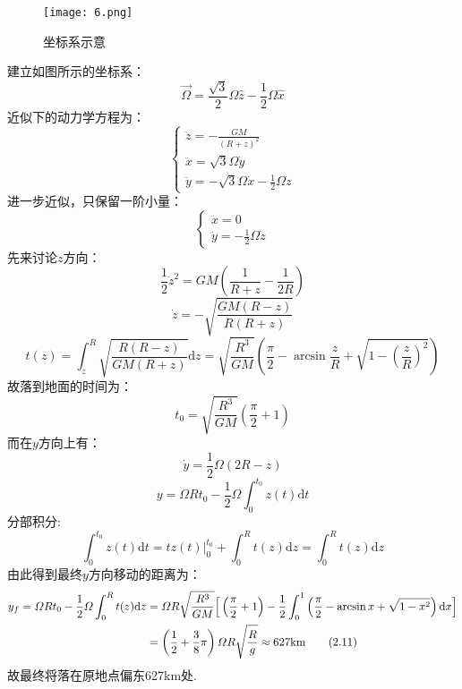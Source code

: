 \documentclass{ctexart}
\begin{document}
\begin{figure}[H]
  \centering
  \texttt{[image: 6.png]}
\caption*{坐标系示意}
\end{figure}
\noindent 建立如图所示的坐标系：
\begin{equation}
\vec{\varOmega}=\frac{\sqrt{3}}{2}\varOmega\hat{z}-\frac{1}{2}\varOmega\hat{x}\tag{2.1}
\end{equation}
近似下的动力学方程为：
	\begin{equation}
  \begin{cases}
		\displaystyle \ddot{z}=-\frac{GM}{(R+z)^2}\\
		\ddot{x}=\sqrt{3}\varOmega\dot{y}\\
		\ddot{y}=-\sqrt{3}\varOmega\dot{x}-\frac{1}{2}\varOmega\dot{z}
	\end{cases}
  \tag{2.2}
  \end{equation}
进一步近似，只保留一阶小量：
	\begin{equation}
  \begin{cases}
		\ddot{x}=0\\
		\ddot{y}=-\frac{1}{2}\varOmega\dot{z}
	\end{cases} 
  \tag{2.3}
  \end{equation}
	先来讨论$z$方向：
	\begin{equation}
  \frac{1}{2}\dot{z}^2=GM(\frac{1}{R+z}-\frac{1}{2R}) \tag{2.4}
  \end{equation}
	\begin{equation}
  \dot{z}=-\sqrt{\frac{GM(R-z)}{R(R+z)}} \tag{2.5}
  \end{equation}
	\begin{equation}
  t(z)=\int_z^R\sqrt{\frac{R(R-z)}{GM(R+z)}}\mathrm{d}z=\sqrt{\frac{R^3}{GM}}\left(\frac{\pi}{2}-\arcsin{\frac{z}{R}}+\sqrt{1-\left(\frac{z}{R}\right)^2}\right) \tag{2.6}
  \end{equation}
	故落到地面的时间为：
  \begin{equation}
  t_0=\sqrt{\frac{R^3}{GM}}\left(\frac{\pi}{2}+1\right) \tag{2.7}
  \end{equation}
	而在$y$方向上有：
	\begin{equation}
  \dot{y}=\frac{1}{2}\varOmega(2R-z) \tag{2.8}
  \end{equation}
	\begin{equation}
  y=\varOmega Rt_0-\frac{1}{2}\varOmega\int_0^{t_0}z(t)\mathrm{d}t \tag{2.9}
  \end{equation}
	分部积分:
	\begin{equation}
  \int_0^{t_0}z(t)\mathrm{d}t=tz(t)\Big|_0^{t_0}+\int_0^{R}t(z)\mathrm{d}z=\int_0^{R}t(z)\mathrm{d}z
  \tag{2.10}
  \end{equation}
  由此得到最终$y$方向移动的距离为：
	\begin{align*}
		y_f=\varOmega Rt_0-\frac{1}{2}\varOmega\int_0^{R}t(z)\mathrm{d}z&=\varOmega R\sqrt{\frac{R^3}{GM}}\Big[\left(\frac{\pi}{2}+1\right)-\frac{1}{2}\int_0^1\left(\frac{\pi}{2}-\arcsin{x}+\sqrt{1-x^2}\right)\mathrm{d}x\Big]\notag\\
		&=\left(\frac{1}{2}+\frac{3}{8}\pi\right)\varOmega R\sqrt{\frac{R}{g}}\approx627 \mathrm{km}\tag{2.11}
	\end{align*}
	故最终将落在原地点偏东627km处.
\end{document}
